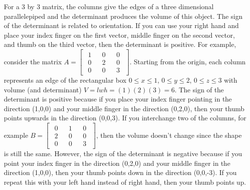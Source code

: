 \documentclass[10pt,]{book}
\theoremstyle{plain}
\theoremstyle{definition}
\theoremstyle{definition}
\theoremstyle{definition}
\theoremstyle{definition}
\theoremstyle{definition}
\numberwithin{equation}{section}
\newcommand{\amp}{&}
\begin{document}
For a 3 by 3 matrix, the columns give the edges of a three dimensional parallelepiped and the determinant produces the volume of this object. The sign of the determinant is related to orientation. If you can use your right hand and place your index finger on the first vector, middle finger on the second vector, and thumb on the third vector, then the determinant is positive. For example, consider the matrix \(A = \begin{bmatrix}{ \begin{matrix}1\\0\\0
\end{matrix}     }\amp  { \begin{matrix}0\\2\\0
\end{matrix}     }\amp  { \begin{matrix}0\\0\\3
\end{matrix}     }
\end{bmatrix}\). Starting from the origin, each column represents an edge of the rectangular box \(0\leq x\leq 1\), \(0\leq y\leq 2\), \(0\leq z\leq 3\) with volume (and determinant) \(V=lwh=(1)(2)(3)=6\). The sign of the determinant is positive because if you place your index finger pointing in the direction (1,0,0) and your middle finger in the direction (0,2,0), then your thumb points upwards in the direction (0,0,3). If you interchange two of the columns, for example \(B = \begin{bmatrix}{ \begin{matrix}0\\2\\0
\end{matrix}     }\amp  { \begin{matrix}1\\0\\0
\end{matrix}     }\amp  { \begin{matrix}0\\0\\3
\end{matrix}     }
\end{bmatrix}\), then the volume doesn't change since the shape is still the same. However, the sign of the determinant is negative because if you point your index finger in the direction (0,2,0) and your middle finger in the direction (1,0,0), then your thumb points down in the direction (0,0,-3). If you repeat this with your left hand instead of right hand, then your thumb points up.%
\end{document}
